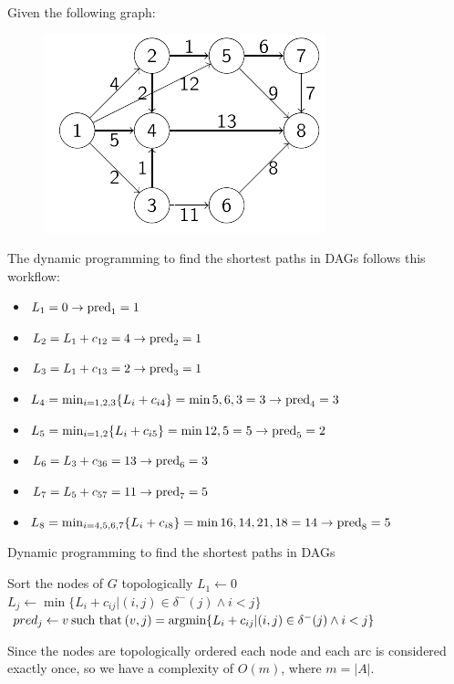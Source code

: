 \documentclass[12pt, a4paper]{report}
\newtheorem[style=M,bodystyle=\normalfont]{proposition}{Proposition}
\newtheorem[style=M,bodystyle=\normalfont]{theorem}{Theorem}
\newtheorem[style=M,bodystyle=\normalfont]{corollary}{Corollary}
\newtheorem[style=M,bodystyle=\normalfont]{lemma}{Lemma}
\newtheorem[style=M,bodystyle=\normalfont]{definition}{Definition}
\begin{document}
    \begin{example}
        Given the following graph: 
        \begin{figure}[H]
            \centering
            \includegraphics[width=0.5\linewidth]{images/DAG.png}
        \end{figure}
        The dynamic programming to find the shortest paths in DAGs follows this workflow: 
        \begin{itemize}
            \item $L_1=0 \rightarrow \textnormal{pred}_1=1$
            \item $L_2=L_1+c_{12}=4 \rightarrow \textnormal{pred}_2=1$
            \item $L_3=L_1+c_{13}=2 \rightarrow \textnormal{pred}_3=1$
            \item $L_4=\min_{i=1,2,3}\{L_i+c_{i4}\}=\min{5,6,3}=3 \rightarrow \textnormal{pred}_4=3$
            \item $L_5=\min_{i=1,2}\{L_i+c_{i5}\}=\min{12,5}=5 \rightarrow \textnormal{pred}_5=2$
            \item $L_6=L_3+c_{36}=13 \rightarrow \textnormal{pred}_6=3$
            \item $L_7=L_5+c_{57}=11 \rightarrow \textnormal{pred}_7=5$
            \item $L_8=\min_{i=4,5,6,7}\{L_i+c_{i8}\}=\min{16,14,21,18}=14 \rightarrow \textnormal{pred}_8=5$
        \end{itemize}
    \end{example}
    \begin{algorithm}[H]
        \caption{Dynamic programming to find the shortest paths in DAGs}
            \begin{algorithmic}[1]
                \State Sort the nodes of $G$ topologically
                \State $L_1 \leftarrow 0$
                    \State $L_j \leftarrow \min\{L_i+c_{ij}|(i,j) \in \delta^{-}(j) \land i < j\}$
                    \State $pred_j \leftarrow v \: \textnormal{such that} \: (v,j)=\textnormal{argmin} \{L_i+c_{ij}|(i,j) \in \delta^{-}(j) \land i < j\}$
                \EndFor
            \end{algorithmic}
    \end{algorithm}
    Since the nodes are topologically ordered each node and each arc is considered exactly once, so we have a complexity of $O(m)$, where $m=\left\lvert A \right\rvert$. 
    
\end{document}
